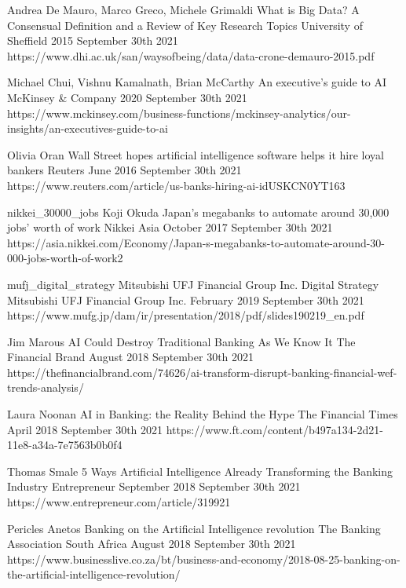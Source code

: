 \begin{thebibliography}{100}
{Andrea De Mauro, Marco Greco, Michele Grimaldi}
{What is Big Data? A Consensual Definition and a Review of Key Research Topics}
{University of Sheffield}
{2015}
{September 30th 2021}
{https://www.dhi.ac.uk/san/waysofbeing/data/data-crone-demauro-2015.pdf}

{Michael Chui, Vishnu Kamalnath, Brian McCarthy}
{An executive’s guide to AI}
{McKinsey \& Company}
{2020}
{September 30th 2021}
{https://www.mckinsey.com/business-functions/mckinsey-analytics/our-insights/an-executives-guide-to-ai}

{Olivia Oran}
{Wall Street hopes artificial intelligence software helps it hire loyal bankers}
{Reuters}
{June 2016}
{September 30th 2021}
{https://www.reuters.com/article/us-banks-hiring-ai-idUSKCN0YT163}

\onlinebibitem
{nikkei_30000_jobs}
{Koji Okuda}
{Japan's megabanks to automate around 30,000 jobs' worth of work}
{Nikkei Asia}
{October 2017}
{September 30th 2021}
{https://asia.nikkei.com/Economy/Japan-s-megabanks-to-automate-around-30-000-jobs-worth-of-work2}

\onlinebibitem
{mufj_digital_strategy}
{Mitsubishi UFJ Financial Group Inc.}
{Digital Strategy}
{Mitsubishi UFJ Financial Group Inc.}
{February 2019}
{September 30th 2021}
{https://www.mufg.jp/dam/ir/presentation/2018/pdf/slides190219\_en.pdf}

{Jim Marous}
{AI Could Destroy Traditional Banking As We Know It}
{The Financial Brand}
{August 2018}
{September 30th 2021}
{https://thefinancialbrand.com/74626/ai-transform-disrupt-banking-financial-wef-trends-analysis/}

{Laura Noonan}
{AI in Banking: the Reality Behind the Hype}
{The Financial Times}
{April 2018}
{September 30th 2021}
{https://www.ft.com/content/b497a134-2d21-11e8-a34a-7e7563b0b0f4}

{Thomas Smale}
{5 Ways Artificial Intelligence Already Transforming the Banking Industry}
{Entrepreneur}
{September 2018}
{September 30th 2021}
{https://www.entrepreneur.com/article/319921}

{Pericles Anetos}
{Banking on the Artificial Intelligence revolution}
{The Banking Association South Africa}
{August 2018}
{September 30th 2021}
{https://www.businesslive.co.za/bt/business-and-economy/2018-08-25-banking-on-the-artificial-intelligence-revolution/}


\end{thebibliography}

